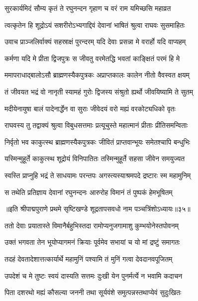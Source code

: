 \twolineshloka
{सुरकार्यमिदं सौम्य कृतं ते रघुनन्दन}
{गृहाण च वरं राम यमिच्छसि महाव्रत}%

\twolineshloka
{त्वत्कृतेन हि शूद्रोऽयं सशरीरोऽभ्यगाद्दिवं}
{देवानां भाषितं श्रुत्वा राघवः सुसमाहितः}%

\twolineshloka
{उवाच प्राञ्जलिर्वाक्यं सहस्राक्षं पुरन्दरम्}
{यदि देवाः प्रसन्ना मे वरार्हो यदि वाप्यहम्}%

\twolineshloka
{कर्मणा यदि मे प्रीता द्विजपुत्रः स जीवतु}
{वरमेतद्धि भवतां काङ्क्षितं परमं हि मे}%

\twolineshloka
{ममापराधाद्बालोऽसौ ब्राह्मणस्यैकपुत्रकः}
{अप्राप्तकालः कालेन नीतो वैवस्वत क्षयम्}%

\twolineshloka
{तं जीवयत भद्रं वो नानृती स्यामहं गुरोः}
{द्विजस्य संश्रुतो ह्यर्थो जीवयिष्यामि ते सुतम्}%

\twolineshloka
{मदीयेनायुषा बालं पादेनार्द्धेन वा सुराः}
{जीवेदयं वरो मह्यं वरकोट्यधिको वृतः}%

\twolineshloka
{राघवस्य तु तद्वाक्यं श्रुत्वा विबुधसत्तमाः}
{प्रत्यूचुस्ते महात्मानं प्रीताः प्रीतिसमन्विताः}%

\twolineshloka
{निर्वृतो भव काकुत्स्थ ब्राह्मणस्यैकपुत्रकः}
{जीवितं प्राप्तवान्भूयः समेतश्चापि बन्धुभिः}%

\twolineshloka
{यस्मिन्मुहूर्ते काकुत्स्थ शूद्रोयं विनिपातितः}
{तस्मिन्मुहूर्ते सहसा जीवेन समयुज्यत}%

\twolineshloka
{स्वस्ति प्राप्नुहि भद्रं ते साधयामः परन्तपः}
{अगस्त्यस्याश्रमपदे द्रष्टारः स्म महामुनिम्}%

\twolineshloka
{स तथेति प्रतिज्ञाय देवानां रघुनन्दनः}
{आरुरोह विमानं तं पुष्पकं हेमभूषितम्}%

॥इति श्रीपाद्मपुराणे प्रथमे सृष्टिखण्डे शूद्रतापसवधो नाम पञ्चत्रिंशोऽध्यायः॥३५॥



\twolineshloka
{ततो देवाः प्रयातास्ते विमानैर्बहुभिस्तदा}
{रामोप्यनुजगामाशु कुम्भयोनेस्तपोवनम्}%

\twolineshloka
{उक्तं भगवता तेन भूयोप्यागमनं क्रियाः}
{पूर्वमेव सभायां च यो मां द्रष्टुं समागतः}%

\twolineshloka
{तदहं देवतादेशात्तत्कार्यार्थे महामुनिं}
{पश्यामि तं मुनिं गत्वा देवदानवपूजितम्}%

\twolineshloka
{उपदेशं च मे तुष्टः स्वयं दास्यति सत्तमः}
{दुःखी येन पुनर्मर्त्ये न भवामि कदाचन}%

\twolineshloka
{पिता दशरथो मह्यं कौसल्या जननी तथा}
{सूर्यवंशे समुत्पन्नस्तथाप्येवं सुदुःखितः}%

